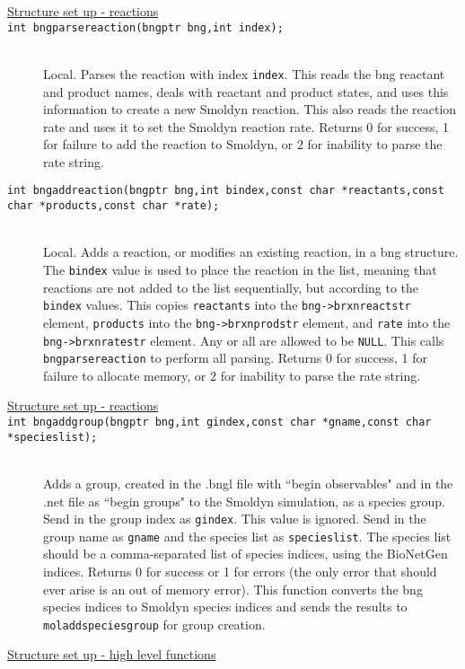 \documentclass {scrbook}
\newcommand {\ttt} {\texttt}
\begin{document}
\begin{description}
\item[\underline{Structure set up - reactions}]

\item[\ttt{int bngparsereaction(bngptr bng,int index);}]
\hfill \\
Local. Parses the reaction with index \ttt{index}. This reads the bng reactant and product names, deals with reactant and product states, and uses this information to create a new Smoldyn reaction. This also reads the reaction rate and uses it to set the Smoldyn reaction rate. Returns 0 for success, 1 for failure to add the reaction to Smoldyn, or 2 for inability to parse the rate string.

\item[\ttt{int bngaddreaction(bngptr bng,int bindex,const char *reactants,const char *products,const char *rate);}]
\hfill \\
Local. Adds a reaction, or modifies an existing reaction, in a bng structure. The \ttt{bindex} value is used to place the reaction in the list, meaning that reactions are not added to the list sequentially, but according to the \ttt{bindex} values. This copies \ttt{reactants} into the \ttt{bng->brxnreactstr} element, \ttt{products} into the \ttt{bng->brxnprodstr} element, and \ttt{rate} into the \ttt{bng->brxnratestr} element. Any or all are allowed to be \ttt{NULL}. This calls \ttt{bngparsereaction} to perform all parsing. Returns 0 for success, 1 for failure to allocate memory, or 2 for inability to parse the rate string.

\item[\underline{Structure set up - reactions}]

\item[\ttt{int bngaddgroup(bngptr bng,int gindex,const char *gname,const char *specieslist);}]
\hfill \\
Adds a group, created in the .bngl file with ``begin observables" and in the .net file as ``begin groups" to the Smoldyn simulation, as a species group. Send in the group index as \ttt{gindex}. This value is ignored. Send in the group name as \ttt{gname} and the species list as \ttt{specieslist}. The species list should be a comma-separated list of species indices, using the BioNetGen indices. Returns 0 for success or 1 for errors (the only error that should ever arise is an out of memory error). This function converts the bng species indices to Smoldyn species indices and sends the results to \ttt{moladdspeciesgroup} for group creation.

\item[\underline{Structure set up - high level functions}]


\end{description}
\end{document}
